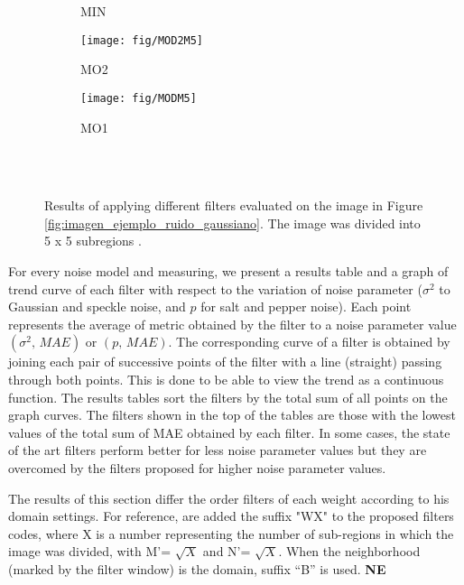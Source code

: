 \begin{figure*}
{\begin{subfigure}[b]{0.25\textwidth}
			\caption{MIN}
			\label{fig:min}
		\end{subfigure}
		\begin{subfigure}[b]{0.25\textwidth}
			\centering
			\texttt{[image: fig/MOD2M5]}
			\caption{MO2}
			\label{fig:mo2}
		\end{subfigure}
		\begin{subfigure}[b]{0.25\textwidth}
			\centering
			\texttt{[image: fig/MODM5]}
			\caption{MO1}
			\label{fig:mo1}
		\end{subfigure}
	}\\
	\\
	\caption{Results of applying different filters evaluated on the image in Figure \ref{fig:imagen_ejemplo_ruido_gaussiano}. The image was divided into 5 x 5 subregions .}	
	\label{fig:imagenes_resultado}
\end{figure*}

For every noise model and measuring, we present a results table and a graph of trend curve of each filter with respect to the variation of noise parameter ($\sigma^2$ to Gaussian and speckle noise, and $p$ for salt and pepper noise). Each point represents the average of metric obtained by the filter to a noise parameter value $(\sigma^2, \, MAE)$ or $(p,\,MAE)$. The corresponding curve of a filter is obtained by joining each pair of successive points of the filter with a line (straight) passing through both points. This is done to be able to view the trend as a continuous function. The results tables sort the filters by the total sum of all points on the graph curves. The filters shown in the top of the tables are those with the lowest values of the total sum of MAE obtained by each filter. In some cases, the state of the art filters perform better for less noise parameter values but they are overcomed by the filters proposed for higher noise parameter values. 

 The results of this section differ the order filters of each weight according to his domain settings. For reference, are added the suffix "WX" to the proposed filters codes, where X is a number representing the number of sub-regions in which the image was divided, with M'= $\sqrt{X}$ and N'= $\sqrt{X}$. When the neighborhood (marked by the filter window) is the domain, suffix ``B'' is used. \textbf{NE} %

